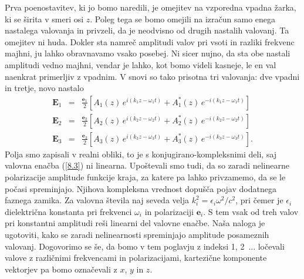 \documentclass[11pt,fleqn]{book} %
\begin{document}
Prva poenostavitev, ki jo bomo naredili, je omejitev na vzporedna vpadna žarka,
ki se širita v smeri osi $z$. Poleg tega se bomo omejili na izračun samo enega
nastalega valovanja in privzeli, da je neodvisno od drugih nastalih valovanj.
Ta omejitev ni huda. Dokler sta namreč amplitudi valov pri vsoti in razliki
frekvenc majhni, ju lahko obravnavamo vsako posebej. Ni sicer nujno,
da sta obe nastali amplitudi vedno majhni, vendar je lahko, kot bomo videli kasneje, 
le en val naenkrat primerljiv z vpadnim. V snovi so tako prisotna tri valovanja:
dve vpadni in tretje, novo nastalo
\begin{eqnarray}
\mathbf{E}_{1} & = & \frac{\mathbf{e}_{1}}{2}\left[A_{1}(z)\, 
e^{i(k_{1}z-\omega_{1}t)}+A_{1}^{*}(z)\, e^{-i(k_{1}z-\omega_{1}t)}\right]\nonumber \\
\mathbf{E}_{2} & = & \frac{\mathbf{e}_{2}}{2}\left[A_{2}(z)\, 
e^{i(k_{2}z-\omega_{2}t)}+A_{2}^{*}(z)\, e^{-i(k_{2}z-\omega_{2}t)}\right]\nonumber \\
\mathbf{E}_{3} & = & \frac{\mathbf{e}_{3}}{2}\left[A_{3}(z)\, 
e^{i(k_{3}z-\omega_{3}t)}+A_{3}^{*}(z)\, e^{-i(k_{3}z-\omega_{3}t)}\right].
\end{eqnarray}
Polja smo zapisali v realni obliki, to je s konjugirano-kompleksnimi
deli, saj valovna enačba (\ref{8.3}) ni linearna. Upoštevali smo tudi,
da so zaradi nelinearne polarizacije amplitude funkcije kraja, za
katere pa lahko privzamemo, da se le počasi spreminjajo. Njihova kompleksna vrednost
dopušča pojav dodatnega faznega zamika. Za valovna
števila naj seveda velja $k_{i}^{2}=\epsilon_{i}\omega^{2}/c^{2}$,
pri čemer je $\epsilon_{i}$ dielektrična konstanta pri frekvenci
$\omega_{i}$ in polarizaciji $\mathbf{e}_{i}$. S tem vsak od treh valov
pri konstantni amplitudi reši linearni del valovne enačbe. Naša naloga
je ugotoviti, kako se zaradi nelinearnosti spreminjajo amplitude posameznih valovanj.
Dogovorimo se še, da bomo v tem poglavju z indeksi 1, 2~... ločevali
valove z različnimi frekvencami in polarizacijami, kartezične komponente
vektorjev pa bomo označevali z $x$, $y$ in $z$. 
\end{document}
